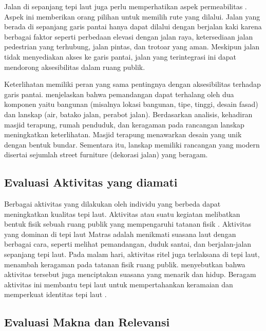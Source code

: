 \documentclass[11pt]{simart} %
\begin{document}
Jalan di sepanjang tepi laut juga perlu memperhatikan aspek permeabilitas \citep{wanismail2018}. Aspek ini memberikan orang pilihan untuk memilih rute yang dilalui. Jalan yang berada di sepanjang garis pantai hanya dapat dilalui dengan berjalan kaki karena berbagai faktor seperti perbedaan elevasi dengan jalan raya, ketersediaan jalan pedestrian yang terhubung, jalan pintas, dan trotoar yang aman. Meskipun jalan tidak menyediakan akses ke garis pantai, jalan yang terintegrasi ini dapat mendorong aksesibilitas dalam ruang publik.

Keterlihatan memiliki peran yang sama pentingnya dengan aksesibilitas terhadap garis pantai. \cite{wanismail2018} menjelaskan bahwa pemandangan dapat terhalang oleh dua komponen yaitu bangunan (misalnya lokasi bangunan, tipe, tinggi, desain fasad) dan lanskap (air, batako jalan, perabot jalan). Berdasarkan analisis, kehadiran masjid terapung, rumah penduduk, dan keragaman pada rancangan lanskap meningkatkan keterlihatan. Masjid terapung menawarkan desain yang unik dengan bentuk bundar. Sementara itu, lanskap memiliki rancangan yang modern disertai sejumlah street furniture (dekorasi jalan) yang beragam.

\subsection{Evaluasi Aktivitas yang diamati}%
\label{sub:Evaluasi Aktivitas yang diamati}

Berbagai aktivitas yang dilakukan oleh individu yang berbeda dapat meningkatkan kualitas tepi laut. Aktivitas atau suatu kegiatan melibatkan bentuk fisik sebuah ruang publik yang mempengaruhi tatanan fisik \citep{wanismail2018}. Aktivitas yang dominan di tepi laut Matras adalah menikmati suasana laut dengan berbagai cara, seperti melihat pemandangan, duduk santai, dan berjalan-jalan sepanjang tepi laut. Pada malam hari, aktivitas ritel juga terlaksana di tepi laut, menambah keragaman pada tatanan fisik ruang publik. \cite{wanismail2018} menyebutkan bahwa aktivitas tersebut juga menciptakan suasana yang menarik dan hidup. Beragam aktivitas ini membantu tepi laut untuk mempertahankan keramaian dan memperkuat identitas tepi laut \citep{iqbal2020}.

\subsection{Evaluasi Makna dan Relevansi}%
\label{sub:Evaluasi Makna dan Relevansi}
\end{document}

